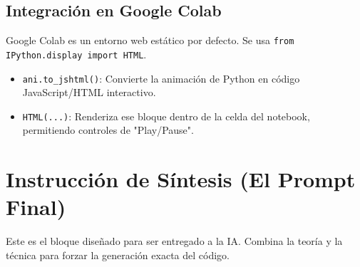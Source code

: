 \documentclass[a4paper,11pt]{article}
\begin{document}
	\subsection{Integración en Google Colab}
	Google Colab es un entorno web estático por defecto. Se usa \texttt{from IPython.display import HTML}.
	\begin{itemize}
		\item \texttt{ani.to\_jshtml()}: Convierte la animación de Python en código JavaScript/HTML interactivo.
		\item \texttt{HTML(...)}: Renderiza ese bloque dentro de la celda del notebook, permitiendo controles de "Play/Pause".
	\end{itemize}
	
	\newpage
	
	\section{Instrucción de Síntesis (El Prompt Final)}
	Este es el bloque diseñado para ser entregado a la IA. Combina la teoría y la técnica para forzar la generación exacta del código.
	
\end{document}
